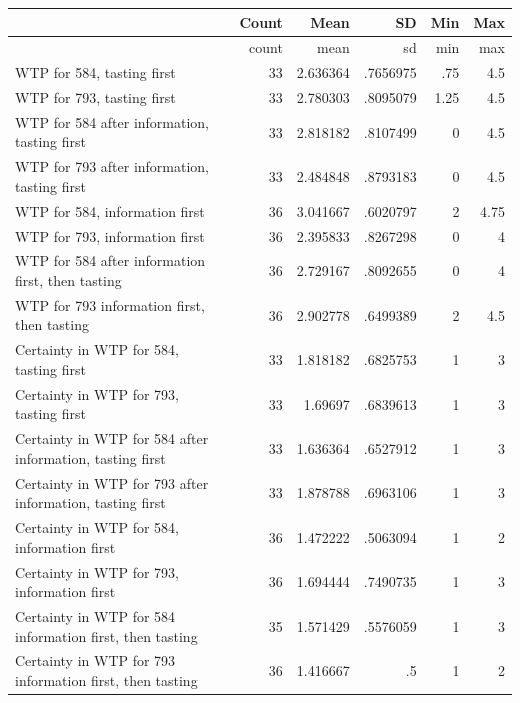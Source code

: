 \begin{tabular*}{\textwidth}{@{\extracolsep{\fill}}l*{5}{r}} \toprule & Count & Mean & SD & Min & Max \\ \midrule
                    &       count&        mean&          sd&         min&         max\\
\midrule
WTP for 584, tasting first&          33&    2.636364&    .7656975&         .75&         4.5\\
WTP for 793, tasting first&          33&    2.780303&    .8095079&        1.25&         4.5\\
WTP for 584 after information, tasting first&          33&    2.818182&    .8107499&           0&         4.5\\
WTP for 793 after information, tasting first&          33&    2.484848&    .8793183&           0&         4.5\\
WTP for 584, information first&          36&    3.041667&    .6020797&           2&        4.75\\
WTP for 793, information first&          36&    2.395833&    .8267298&           0&           4\\
WTP for 584 after information first, then tasting&          36&    2.729167&    .8092655&           0&           4\\
WTP for 793 information first, then tasting&          36&    2.902778&    .6499389&           2&         4.5\\
Certainty in WTP for 584, tasting first&          33&    1.818182&    .6825753&           1&           3\\
Certainty in WTP for 793, tasting first&          33&     1.69697&    .6839613&           1&           3\\
Certainty in WTP for 584 after information, tasting first&          33&    1.636364&    .6527912&           1&           3\\
Certainty in WTP for 793 after information, tasting first&          33&    1.878788&    .6963106&           1&           3\\
Certainty in WTP for 584, information first&          36&    1.472222&    .5063094&           1&           2\\
Certainty in WTP for 793, information first&          36&    1.694444&    .7490735&           1&           3\\
Certainty in WTP for 584 information first, then tasting&          35&    1.571429&    .5576059&           1&           3\\
Certainty in WTP for 793 information first, then tasting&          36&    1.416667&          .5&           1&           2\\

\end{tabular*}
